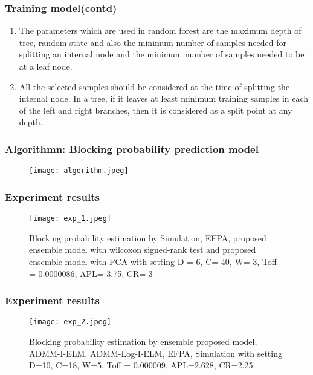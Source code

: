 \documentclass{beamer}
\begin{document}
\begin{frame}[fragile]
\frametitle{Training model(contd)}
\begin{enumerate}
    \item The parameters which are used in random forest are the maximum depth of tree, random state and also the minimum number of samples needed for splitting an internal node and the minimum number of samples needed to be at a leaf node.
    \item All the selected samples should be considered at the time of splitting the internal node.
    In a tree, if it leaves at least minimum training samples in each of the left and right branches, then it is considered as a split point at any depth.

\end{enumerate}
\end{frame}


\begin{frame}[fragile]
\frametitle{Algorithmn: Blocking probability prediction model}
\begin{figure}
    \texttt{[image: algorithm.jpeg]}
\end{figure}
\end{frame}

  
\begin{frame}[fragile]
\frametitle{Experiment results}
\begin{figure}
    \texttt{[image: exp\_1.jpeg]}
    \caption{Blocking probability estimation by Simulation, EFPA, proposed ensemble model with wilcoxon signed-rank test and proposed ensemble model with PCA with setting D = 6, C= 40, W= 3, Toff = 0.0000086, APL= 3.75, CR= 3}
\end{figure}
\end{frame}

\begin{frame}[fragile]
\frametitle{Experiment results}
\begin{figure}
    \texttt{[image: exp\_2.jpeg]}
    \caption{ Blocking probability estimation by ensemble proposed model, ADMM-I-ELM, ADMM-Log-I-ELM, EFPA, Simulation with setting D=10, C=18, W=5, Toff = 0.000009, APL=2.628, CR=2.25}
\end{figure}
\end{frame}
\end{document}

